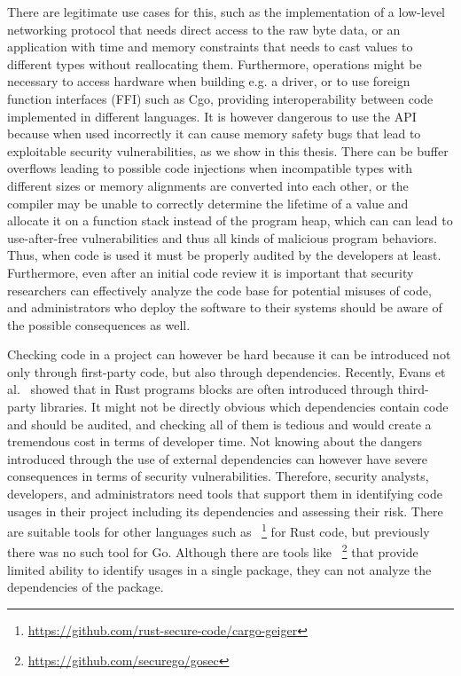 There are legitimate use cases for this, such as the implementation of a low-level networking protocol that needs
direct access to the raw byte data, or an application with time and memory constraints that needs to cast values to
different types without reallocating them.
Furthermore, \unsafe{} operations might be necessary to access hardware when building e.g. a driver, or to use
foreign function interfaces (\acrshort{FFI}) such as Cgo, providing interoperability between code implemented in
different languages.
It is however dangerous to use the \unsafe{} \acrshort{API} because when used incorrectly it can cause memory safety
bugs that lead to exploitable security vulnerabilities, as we show in this thesis.
There can be buffer overflows leading to possible code injections when incompatible types with different sizes or
memory alignments are converted into each other, or the compiler may be unable to correctly determine the lifetime of
a value and allocate it on a function stack instead of the program heap, which can can lead to use-after-free
vulnerabilities and thus all kinds of malicious program behaviors.
Thus, when \unsafe{} code is used it must be properly audited by the developers at least.
Furthermore, even after an initial code review it is important that security researchers can effectively analyze the
code base for potential misuses of \unsafe{} code, and administrators who deploy the software to their systems should
be aware of the possible consequences as well.

Checking \unsafe{} code in a project can however be hard because it can be introduced not only through first-party
code, but also through dependencies.
Recently, Evans et al.~\cite{evans2020} showed that in Rust programs \unsafe{} blocks are often introduced through
third-party libraries.
It might not be directly obvious which dependencies contain \unsafe{} code and should be audited, and checking all of
them is tedious and would create a tremendous cost in terms of developer time.
Not knowing about the dangers introduced through the use of external dependencies can however have severe consequences
in terms of security vulnerabilities.
Therefore, security analysts, developers, and administrators need tools that support them in identifying \unsafe{}
code usages in their project including its dependencies and assessing their risk.
There are suitable tools for other languages such as \toolCargoGeiger{}~\footnote{\url{https://github.com/rust-secure-code/cargo-geiger}}
for Rust code, but previously there was no such tool for Go.
Although there are tools like \toolGosec{}~\footnote{\url{https://github.com/securego/gosec}} that provide limited
ability to identify \unsafe{} usages in a single package, they can not analyze the dependencies of the package.


